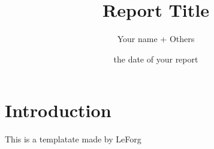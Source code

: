 \documentclass[10pt]{report}
\title{\Huge\bfseries{Report Title}}
\author{Your name + Others}
\date{the date of your report}
\begin{document}
\maketitle
\tableofcontents
\listoffigures

\chapter*{Introduction}

\large{
  This is a templatate made by LeForg \cite{leforg}
}



\normalsize


\newpage





\appendix



\end{document}
